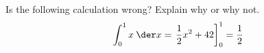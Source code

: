 Is the following calculation wrong? Explain why or why not.
\begin{equation*}
  \int_0^1 x\:\der x = \left.\frac{1}{2}x^2+42\right]_0^1 = \frac{1}{2}
\end{equation*}
